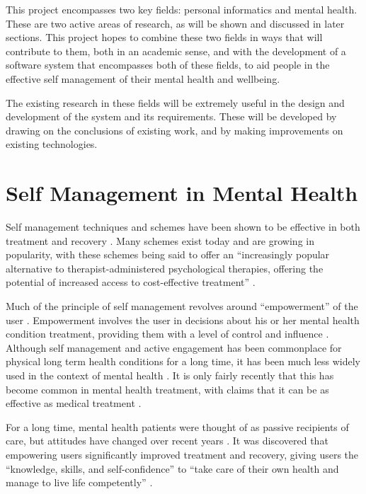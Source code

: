 \documentclass[11pt,openright,a4paper]{report}
\begin{document}
This project encompasses two key fields: personal informatics and mental health. These are two active areas of research, as will be shown and discussed in later sections. This project hopes to combine these two fields in ways that will contribute to them, both in an academic sense, and with the development of a software system that encompasses both of these fields, to aid people in the effective self management of their mental health and wellbeing.

The existing research in these fields will be extremely useful in the design and development of the system and its requirements. These will be developed by drawing on the conclusions of existing work, and by making improvements on existing technologies.

\section{Self Management in Mental Health}
Self management techniques and schemes have been shown to be effective in both treatment \parencite{wrapstudy} and recovery \parencite{selfmanagementrelapse}. Many schemes exist today and are growing in popularity, with these schemes being said to offer an \enquote{increasingly popular alternative to therapist-administered psychological therapies, offering the potential of increased access to cost-effective treatment} \parencite{selfhelpanxiety}.

Much of the principle of self management revolves around \enquote{empowerment} of the user \parencite{whoselfmanagement}. Empowerment involves the user in decisions about his or her mental health condition treatment, providing them with a level of control and influence \parencite{whoempowerment}. Although self management and active engagement has been commonplace for physical long term health conditions for a long time, it has been much less widely used in the context of mental health \parencite{whoselfmanagement}. It is only fairly recently that this has become common in mental health treatment, with claims that it can be as effective as medical treatment \parencite{mhfselfmanagement}.

For a long time, mental health patients were thought of as passive recipients of care, but attitudes have changed over recent years \parencite{cpselfmanagement}. It was discovered that empowering users significantly improved treatment and recovery, giving users the \enquote{knowledge, skills, and self-confidence} to \enquote{take care of their own health and manage to live life competently} \parencite{vahdatpatientinvolvement}.
\end{document}
